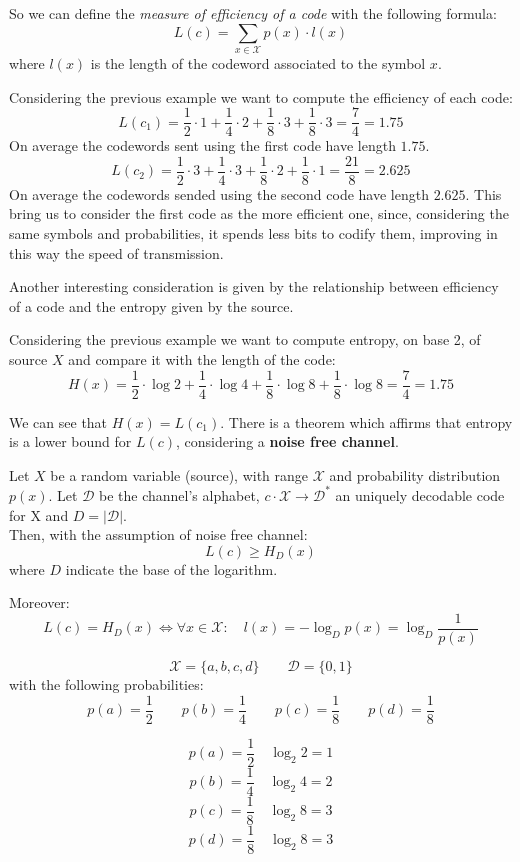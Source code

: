 So we can define the \textit{measure of efficiency of a code} with the following formula:
		$$L(c)=\sum_{x \in \mathcal{X}} p(x)\cdot l(x)$$
where $l(x)$ is the length of the codeword associated to the symbol $x$.

\begin{exmp} Considering the previous example we want to compute the efficiency of each code:
	$$
		L(c_1) = \frac{1}{2} \cdot 1 + \frac{1}{4} \cdot 2 + \frac{1}{8} \cdot 3 + \frac{1}{8} \cdot 3 = \frac{7}{4} = 1.75
	$$
	On average the codewords sent using the first code have length $1.75$.
	$$	
		L(c_2) = \frac{1}{2} \cdot 3 + \frac{1}{4} \cdot 3 + \frac{1}{8} \cdot 2 + \frac{1}{8} \cdot 1 = \frac{21}{8} = 2.625
	$$
	On average the codewords sended using the second code have length $2.625$. This bring us to consider the first code as the more efficient one, since, considering the same symbols and probabilities, it spends less bits to codify them, improving in this way the speed of transmission.
\end{exmp}

Another interesting consideration is given by the relationship between efficiency of a code and the entropy given by the source.

\begin{exmp} Considering the previous example we want to compute entropy, on base 2, of source $X$ and compare it with the length of the code:
	$$
		H(x) = \frac{1}{2} \cdot \log2 + \frac{1}{4} \cdot \log4 + \frac{1}{8} \cdot \log8 + \frac{1}{8} \cdot \log8 = \frac{7}{4} = 1.75
	$$
\end{exmp}

We can see that $H(x) = L(c_1)$. There is a theorem which affirms that entropy is a lower bound for $L(c)$, considering a \textbf{noise free channel}.
\begin{thm} 
	Let $X$ be a random variable (source), with range $\mathcal{X}$ and probability distribution $p(x)$. 
	Let $\mathcal{D}$ be the channel's alphabet, $c \cdot \mathcal{X} \rightarrow \mathcal{D}^*$ an uniquely decodable code for X and $D = |\mathcal{D}|$.\\
	Then, with the assumption of noise free channel: 
	$$ L(c) \geq H_D(x)$$
	where $D$ indicate the base of the logarithm. 
	
	Moreover:
	$$ L(c) = H_D(x) \iff \forall x \in \mathcal{X}: \quad l(x) = -\log_D p(x) = \log_D \frac{1}{p(x)} $$
\end{thm}

\begin{exmp}
$$\mathcal{X} = \{a, b, c, d\} \qquad \mathcal{D} = \{0,1\}$$
with the following probabilities:
$$p(a) = \frac{1}{2} \qquad p(b) = \frac{1}{4} \qquad p(c) = \frac{1}{8} \qquad p(d) = \frac{1}{8}$$

$$ p(a) = \frac{1}{2} \quad \log_2 2 = 1$$
$$ p(b) = \frac{1}{4} \quad \log_2 4 = 2$$
$$ p(c) = \frac{1}{8} \quad \log_2 8 = 3$$
$$ p(d) = \frac{1}{8} \quad \log_2 8 = 3$$
\end{exmp}

